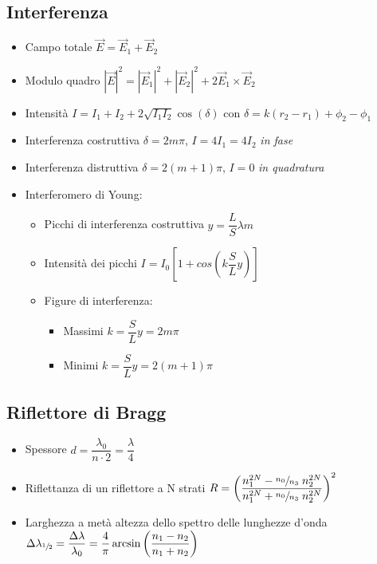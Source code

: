 \documentclass{article}
\begin{document}
\subsection{Interferenza}
\begin{itemize}
  \item Campo totale \( \vec{E} = \vec{E}_1 + \vec{E}_2 \)
  \item Modulo quadro \( \displaystyle |\vec{E}| ^ 2 = |\vec{E}_1| ^ 2 + |\vec{E}_2| ^ 2 + 2 \vec{E}_1 \times \vec{E}_2 \)
  \item Intensità \( \displaystyle  I = I_1 + I_2 + 2 \sqrt{I_1 I_2} \cos(\delta) \) con \( \delta = k(r_2 - r_1) + \phi_2 - \phi_1 \) %
  \item Interferenza costruttiva \( \delta = 2 m \pi \), \(I = 4 I_1 = 4 I_2 \) \textit{in fase}
  \item Interferenza distruttiva \( \delta = 2 (m + 1) \pi \), \(I = 0 \) \textit{in quadratura}
  \item Interferomero di Young:
        \begin{itemize}
          \item Picchi di interferenza costruttiva \( y = \dfrac{L}{S} \lambda m \)
          \item Intensità dei picchi \( I = I_0  \left[ 1 + cos\left( k \dfrac{S}{L} y \right) \right] \)
          \item Figure di interferenza:
                \begin{itemize}
                  \item Massimi \( k = \dfrac{S}{L} y = 2m \pi \)
                  \item Minimi \( k = \dfrac{S}{L} y = 2(m+1) \pi \)
                \end{itemize}
        \end{itemize}
\end{itemize}

\newpage

\subsection{Riflettore di Bragg}
\begin{itemize}
  \item Spessore \( d = \dfrac{\lambda_0}{n \cdot 2} = \dfrac{\lambda}{4} \)
  \item Riflettanza di un riflettore a N strati \( R = \left( \dfrac{n_1 ^ {2N} - \sfrac{n_0}{n_3} \; n_2 ^ {2N}}{n_1 ^ {2N} + \sfrac{n_0}{n_3} \; n_2 ^ {2N}} \right) ^ 2 \)
  \item Larghezza a metà altezza dello spettro delle lunghezze d'onda \( \Delta \lambda_{\sfrac{1}{2}} = \dfrac{\Delta \lambda}{\lambda_0} = \dfrac{4}{\pi} \arcsin \left( \dfrac{n_1 - n_2}{n_1 + n_2} \right) \)
\end{itemize}
\end{document}
